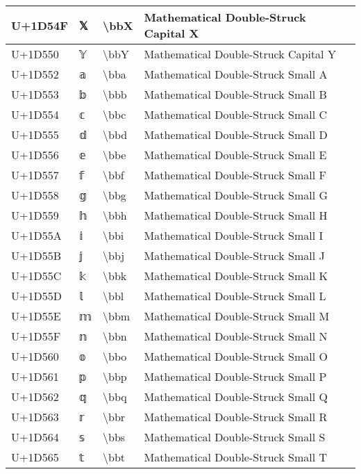 \begin{table}[h]
\begin{tabulary}{\linewidth}{|L|L|L|L|}
\hline
U+1D54F & 𝕏 & {\textbackslash}bbX & Mathematical Double-Struck Capital X \\
\hline
U+1D550 & 𝕐 & {\textbackslash}bbY & Mathematical Double-Struck Capital Y \\
\hline
U+1D552 & 𝕒 & {\textbackslash}bba & Mathematical Double-Struck Small A \\
\hline
U+1D553 & 𝕓 & {\textbackslash}bbb & Mathematical Double-Struck Small B \\
\hline
U+1D554 & 𝕔 & {\textbackslash}bbc & Mathematical Double-Struck Small C \\
\hline
U+1D555 & 𝕕 & {\textbackslash}bbd & Mathematical Double-Struck Small D \\
\hline
U+1D556 & 𝕖 & {\textbackslash}bbe & Mathematical Double-Struck Small E \\
\hline
U+1D557 & 𝕗 & {\textbackslash}bbf & Mathematical Double-Struck Small F \\
\hline
U+1D558 & 𝕘 & {\textbackslash}bbg & Mathematical Double-Struck Small G \\
\hline
U+1D559 & 𝕙 & {\textbackslash}bbh & Mathematical Double-Struck Small H \\
\hline
U+1D55A & 𝕚 & {\textbackslash}bbi & Mathematical Double-Struck Small I \\
\hline
U+1D55B & 𝕛 & {\textbackslash}bbj & Mathematical Double-Struck Small J \\
\hline
U+1D55C & 𝕜 & {\textbackslash}bbk & Mathematical Double-Struck Small K \\
\hline
U+1D55D & 𝕝 & {\textbackslash}bbl & Mathematical Double-Struck Small L \\
\hline
U+1D55E & 𝕞 & {\textbackslash}bbm & Mathematical Double-Struck Small M \\
\hline
U+1D55F & 𝕟 & {\textbackslash}bbn & Mathematical Double-Struck Small N \\
\hline
U+1D560 & 𝕠 & {\textbackslash}bbo & Mathematical Double-Struck Small O \\
\hline
U+1D561 & 𝕡 & {\textbackslash}bbp & Mathematical Double-Struck Small P \\
\hline
U+1D562 & 𝕢 & {\textbackslash}bbq & Mathematical Double-Struck Small Q \\
\hline
U+1D563 & 𝕣 & {\textbackslash}bbr & Mathematical Double-Struck Small R \\
\hline
U+1D564 & 𝕤 & {\textbackslash}bbs & Mathematical Double-Struck Small S \\
\hline
U+1D565 & 𝕥 & {\textbackslash}bbt & Mathematical Double-Struck Small T \\

\end{tabulary}
\end{table}
